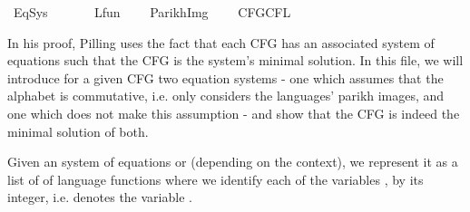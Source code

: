 %
\begin{isabellebody}%
%
%
\isadelimtheory
%
\endisadelimtheory
%
\isatagtheory
{}\isamarkupfalse%
\ Eq{\isacharunderscore}{\kern0pt}Sys\isanewline
\ \ \isanewline
\ \ \ \ {\isachardoublequoteopen}Lfun{\isachardoublequoteclose}\isanewline
\ \ \ \ {\isachardoublequoteopen}Parikh{\isacharunderscore}{\kern0pt}Img{\isachardoublequoteclose}\isanewline
\ \ \ \ {\isachardoublequoteopen}CFG{\isachardot}{\kern0pt}CFL{\isachardoublequoteclose}\isanewline
{}%
\endisatagtheory
{\isafoldtheory}%
%
\isadelimtheory
%
\endisadelimtheory
%
\begin{isamarkuptext}%
In his proof, Pilling uses the fact that each CFG has an associated system of equations such
that the CFG is the system's minimal solution. In this file, we will introduce for a given CFG two
equation systems - one which assumes that the alphabet is commutative, i.e. only considers
the languages' parikh images, and one which does not make this assumption - and show that the CFG
is indeed the minimal solution of both.%
\end{isamarkuptext}\isamarkuptrue%
%
\isadelimdocument
%
\endisadelimdocument
%
\isatagdocument
%
\isamarkuptrue%
%
\endisatagdocument
{\isafolddocument}%
%
\isadelimdocument
%
\endisadelimdocument
%
\begin{isamarkuptext}%
Given an system of equations
 or 
(depending on the context), we represent it as a list of of language functions where we identify
each of the variables , by its integer, i.e.  denotes the variable .

\end{isamarkuptext}
\end{isabellebody}
